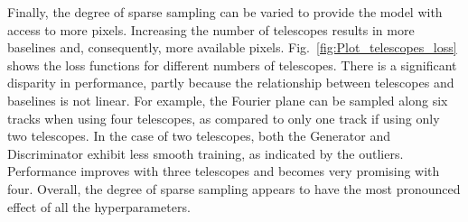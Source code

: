 Finally, the degree of sparse sampling can be varied to provide the model with access to more pixels. Increasing the number of telescopes results in more baselines and, consequently, more available pixels. Fig.~\ref{fig:Plot_telescopes_loss} shows the loss functions for different numbers of telescopes. There is a significant disparity in performance, partly because the relationship between telescopes and baselines is not linear. For example, the Fourier plane can be sampled along six tracks when using four telescopes, as compared to only one track if using only two telescopes. In the case of two telescopes, both the Generator and Discriminator exhibit less smooth training, as indicated by the outliers. Performance improves with three telescopes and becomes very promising with four. Overall, the degree of sparse sampling appears to have the most pronounced effect of all the hyperparameters.
